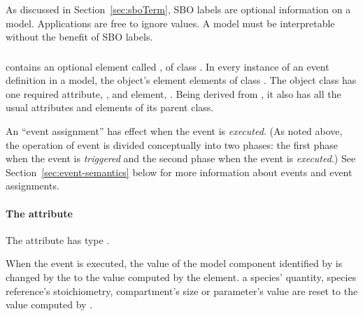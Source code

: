 As discussed in Section~\ref{sec:sboTerm}, SBO labels are optional
information on a model.  Applications are free to ignore
 values.  A model must be interpretable without the
benefit of SBO labels.


\subsubsection{}
\label{sec:eventassignment}
\label{sec:listofeventassignments}

\Event contains an optional element called
, of class \ListOfEventAssignments.
In every instance of an event definition in a model, the object's
 element   elements of class
\EventAssignment.  The object class \EventAssignment has one
required attribute, , and  element,
.  Being derived from \SBase, it also has all the
usual attributes and elements of its parent class.

An ``event assignment'' has effect when the event is
\emph{executed}.  (As noted above, the operation of event is
divided conceptually into two phases: the first phase when the
event is \emph{triggered} and the second phase when the event is
\emph{executed}.)  See Section~\ref{sec:event-semantics} below for
more information about events and event assignments.


\paragraph{The  attribute}

The \EventAssignment attribute  has type .

When the event is executed, the value of
the model component identified by  is changed by
the \EventAssignment to the value computed by the 
element.   a species' quantity, species reference's
stoichiometry, compartment's size or parameter's value are reset
to the value computed by .

